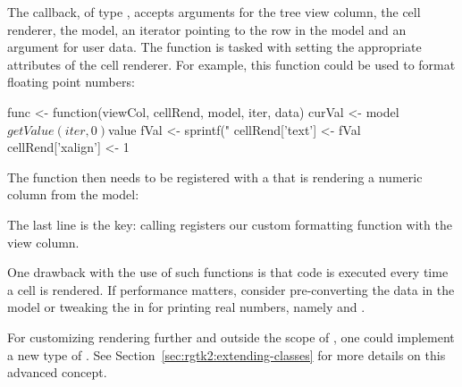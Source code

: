 The callback, of type , accepts arguments
for the tree view column, the cell renderer, the model, an iterator
pointing to the row in the model and an argument for user data. The
function is tasked with setting the appropriate attributes of the cell
renderer. For example, this function could be used to format floating
point numbers:
\begin{Schunk}
\begin{Sinput}
 func <- function(viewCol, cellRend, model, iter, data) {
   curVal <- model$getValue(iter, 0)$value
   fVal <- sprintf("%
   cellRend['text'] <- fVal
   cellRend['xalign'] <- 1
 }
\end{Sinput}
\end{Schunk}
%
The function then needs to be registered with a
 that is rendering a numeric column from the model:
\begin{Schunk}
\end{Schunk}
%
The last line is the key: calling
 registers our custom
formatting function with the view column.

One drawback with the use of such functions is that \R\/ code is
executed every time a cell is rendered. If performance matters,
consider pre-converting the data in the model or tweaking the
 in \R\/ for printing real numbers, namely 
and .

For customizing rendering further and outside the scope of
, one could implement a new type of
.
See Section~\ref{sec:rgtk2:extending-classes} for
more details on this advanced concept.


